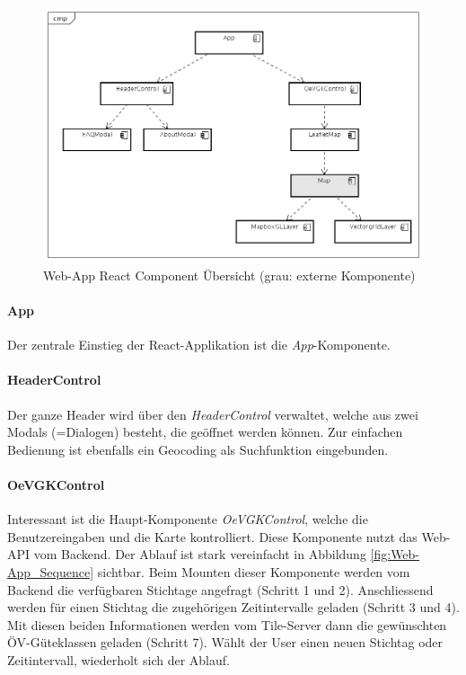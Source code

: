 \begin{figure}[H]
    \centering
    \includegraphics[width=1.0\linewidth]{projectdoc/img/Web-App_Component.png}
    \caption[Web-App React Komponente Übersicht]{Web-App React Component Übersicht (grau: externe Komponente)}
    \label{fig:Web_App_Component}
\end{figure}
 
\paragraph{App}
Der zentrale Einstieg der React-Applikation ist die \emph{App}-Komponente.

\paragraph{HeaderControl}
Der ganze Header wird über den \emph{HeaderControl} verwaltet, welche aus zwei Modals (=Dialogen) besteht, die geöffnet werden können.
Zur einfachen Bedienung ist ebenfalls ein \gls{Geocoding} als Suchfunktion eingebunden.

\paragraph{OeVGKControl}
Interessant ist die Haupt-Komponente \emph{OeVGKControl}, welche die Benutzereingaben und die Karte kontrolliert.
Diese Komponente nutzt das Web-\acs{API} vom Backend.
Der Ablauf ist stark vereinfacht in Abbildung \ref{fig:Web-App_Sequence} sichtbar.
Beim Mounten dieser Komponente werden vom Backend die verfügbaren Stichtage angefragt (Schritt 1 und 2).
Anschliessend werden für einen Stichtag die zugehörigen Zeitintervalle geladen (Schritt 3 und 4).
Mit diesen beiden Informationen werden vom Tile-Server dann die gewünschten \gls{ÖV-Güteklassen} geladen (Schritt 7).
Wählt der User einen neuen Stichtag oder Zeitintervall, wiederholt sich der Ablauf.

